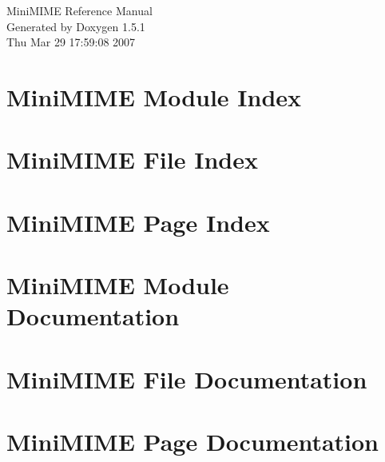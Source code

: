 \documentclass[a4paper]{book}
\begin{document}
\begin{titlepage}
\vspace*{7cm}
\begin{center}
{\Large Mini\-MIME Reference Manual}\\
\vspace*{1cm}
{\large Generated by Doxygen 1.5.1}\\
\vspace*{0.5cm}
{\small Thu Mar 29 17:59:08 2007}\\
\end{center}
\end{titlepage}
\clearemptydoublepage
{}
\tableofcontents
\clearemptydoublepage
{}
\chapter{Mini\-MIME Module Index}

\chapter{Mini\-MIME File Index}

\chapter{Mini\-MIME Page Index}

\chapter{Mini\-MIME Module Documentation}









\chapter{Mini\-MIME File Documentation}












\chapter{Mini\-MIME Page Documentation}

\printindex
\end{document}

